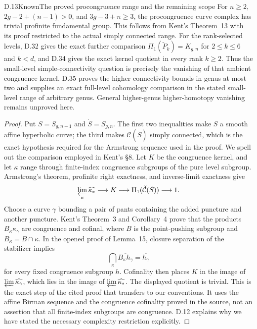 \begin{result}{D.13}{Known}{The proved procongruence range and the remaining scope}
For $n\geq2$, $2g-2+(n-1)>0$, and $3g-3+n\geq3$, the procongruence curve complex has trivial profinite fundamental group. This follows from Kent's Theorem~13 with its proof restricted to the actual simply connected range. For the rank-selected levels, D.32 gives the exact further comparison $\Pi_1(\check P_k)=K_{g,n}$ for $2\leq k\leq6$ and $k<d$, and D.34 gives the exact kernel quotient in every rank $k\geq2$. Thus the small-level simple-connectivity question is precisely the vanishing of that ambient congruence kernel. D.35 proves the higher connectivity bounds in genus at most two and supplies an exact full-level cohomology comparison in the stated small-level range of arbitrary genus. General higher-genus higher-homotopy vanishing remains unproved here.
\end{result}
\begin{proof}
Put $S=S_{g,n-1}$ and $\dot S=S_{g,n}$. The first two inequalities make $S$ a smooth affine hyperbolic curve; the third makes $\mathcal C(\dot S)$ simply connected, which is the exact hypothesis required for the Armstrong sequence used in the proof. We spell out the comparison employed in Kent's \S8. Let $K$ be the congruence kernel, and let $\kappa$ range through finite-index congruence subgroups of the pure level subgroup. Armstrong's theorem, profinite right exactness, and inverse-limit exactness give
\[
 \varprojlim_\kappa\widehat{\kappa_*}\longrightarrow K
 \longrightarrow\Pi_1(\check{\mathcal C}(\dot S))\longrightarrow1.
\]
Choose a curve $\gamma$ bounding a pair of pants containing the added puncture and another puncture. Kent's Theorem~3 and Corollary~4 prove that the products $B_\kappa\kappa_\gamma$ are congruence and cofinal, where $B$ is the point-pushing subgroup and $B_\kappa=B\cap\kappa$. In the opened proof of Lemma~15, closure separation of the stabilizer implies
\[
 \bigcap_\kappa\overline{B_\kappa h_\gamma}
       =\overline{h_\gamma}
\]
for every fixed congruence subgroup $h$. Cofinality then places $K$ in the image of $\varprojlim\widehat{\kappa_\gamma}$, which lies in the image of $\varprojlim\widehat{\kappa_*}$. The displayed quotient is trivial. This is the exact step of the cited proof that transfers to our conventions. It uses the affine Birman sequence and the congruence cofinality proved in the source, not an assertion that all finite-index subgroups are congruence. D.12 explains why we have stated the necessary complexity restriction explicitly.
\end{proof}
